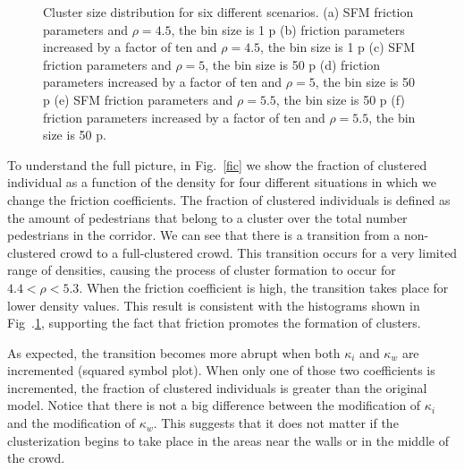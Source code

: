 \begin{figure}[!htbp]
\caption[width=0.47\columnwidth]{Cluster size distribution for six different scenarios. (a) SFM friction parameters and $\rho=4.5$, the bin size is 1 p (b) friction parameters increased by a factor of ten and $\rho=4.5$, the bin size is 1 p (c) SFM friction parameters and $\rho=5$, the bin size is 50 p (d) friction parameters increased by a factor of ten and $\rho=5$, the bin size is 50 p (e) SFM friction parameters and $\rho=5.5$, the bin size is 50 p (f) friction parameters increased by a factor of ten and $\rho=5.5$, the bin size is 50 p.}
\label{cluster_distribution}
\end{figure}

To understand the full picture, in Fig.~\ref{fic} we show the fraction of clustered individual as a function of the density for four different situations in which we change the friction coefficients. The fraction of clustered individuals is defined as the amount of pedestrians that belong to a cluster over the total number pedestrians in the corridor. 
We can see that there is a transition from a non-clustered crowd to a full-clustered crowd. This transition occurs for a very limited range of densities, causing the process of cluster formation to occur for $4.4<\rho<5.3$. When the friction coefficient is high, the transition takes place for lower density values. This result is consistent with the histograms shown in Fig~.\ref{cluster_distribution}, supporting the fact that friction promotes the formation of clusters. 

As expected, the transition becomes more abrupt when both $\kappa_i$ and $\kappa_w$ are incremented (squared symbol plot). When only one of those two coefficients is incremented, the fraction of clustered individuals is greater than the original model. Notice that there is not a big difference between the modification of $\kappa_i$ and the modification of $\kappa_w$. This suggests that it does not matter if the clusterization begins to take place in the areas near the walls or in the middle of the crowd.


